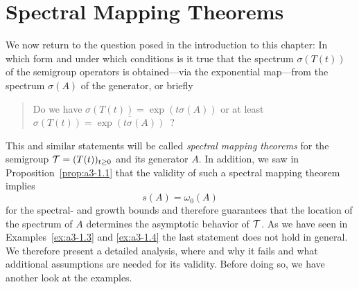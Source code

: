 \section{Spectral Mapping Theorems}\label{sec:a3-6}%
We now return to the question posed in the introduction to this chapter: In which form and under which conditions is it true that the spectrum $\sigma(T(t))$ of the semigroup operators is obtained---via the exponential map---from the spectrum $\sigma(A)$ of the generator, or briefly
\begin{quote}
Do we have  $\sigma(T(t)) = \exp(t \sigma(A) )$  or at least 
 $\sigma(T(t)) = \overline{\exp(t\sigma(A))}$ \,?
\end{quote}
This and similar statements will be called \emph{spectral mapping theorems} for the semigroup $\mathcal{T} = (T(t))_{t \geq 0}$ and its generator $A$.
In addition, we saw in Proposition~\ref{prop:a3-1.1} that the validity of such a spectral mapping theorem implies
\[
s(A) = \omega_{0}(A)
\]
for the spectral- and growth bounds and therefore guarantees that the location of the spectrum of $A$ determines the asymptotic behavior of $\mathcal{T}$.
As we have seen in Examples~\ref{ex:a3-1.3} and \ref{ex:a3-1.4} the last statement does not hold in general.
We therefore present a detailed analysis, where and why it fails and what additional assumptions are needed for its validity.
Before doing so, we have another look at the examples.
